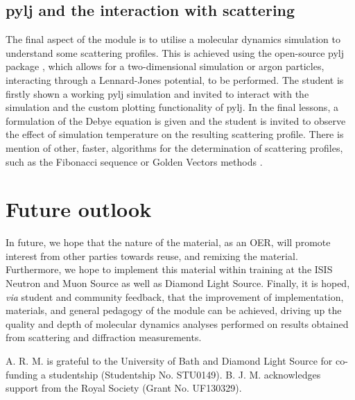 \documentclass[amsmath,amssymb,twocolumn,superscriptaddress]{revtex4-1}
\begin{document}
\subsection{pylj and the interaction with scattering}

The final aspect of the module is to utilise a molecular dynamics simulation to understand some scattering profiles.
This is achieved using the open-source pylj package \cite{mccluskey_pylj_2018}, which allows for a two-dimensional simulation or argon particles, interacting through a Lennard-Jones potential, to be performed.
The student is firstly shown a working pylj simulation and invited to interact with the simulation and the custom plotting functionality of pylj.
In the final lessons, a formulation of the Debye equation \cite{debye_zerstreuung_1915} is given and the student is invited to observe the effect of simulation temperature on the resulting scattering profile.
There is mention of other, faster, algorithms for the determination of scattering profiles, such as the Fibonacci sequence or Golden Vectors methods \cite{svergun_solution_1994,watson_rapid_2013}.

\section{Future outlook}

In future, we hope that the nature of the material, as an OER, will promote interest from other parties towards reuse, and remixing the material.
Furthermore, we hope to implement this material within training at the ISIS Neutron and Muon Source as well as Diamond Light Source.
Finally, it is hoped, \textit{via} student and community feedback, that the improvement of implementation, materials, and general pedagogy of the module can be achieved, driving up the quality and depth of molecular dynamics analyses performed on results obtained from scattering and diffraction measurements.

\begin{acknowledgements}
A. R. M. is grateful to the University of Bath and Diamond Light Source for co-funding a studentship (Studentship No. STU0149).
B. J. M. acknowledges support from the Royal Society (Grant No. UF130329).
\end{acknowledgements}


\end{document}
